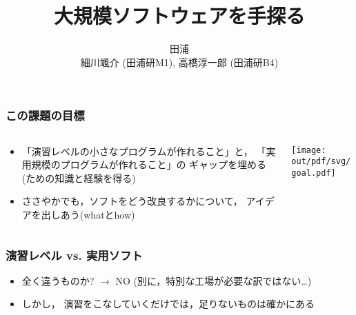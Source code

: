 \documentclass[12pt,dvipdfmx]{beamer}
\title{大規模ソフトウェアを手探る}
\institute{}
\author{田浦 \\ 細川颯介 (田浦研M1), 高橋淳一郎 (田浦研B4) }
\date{}
\newcommand{\mura}[1]{{\color{purple}#1}}
\begin{document}
\maketitle

\iffalse
\begin{frame}
\frametitle{Contents}
\tableofcontents
\end{frame}
\fi

\begin{frame}
\frametitle{この課題の目標}
\begin{columns}
\begin{column}{0.4\textwidth}
  \begin{itemize}
  \item 「演習レベルの小さなプログラムが作れること」と，
    「実用規模のプログラムが作れること」の
    ギャップを埋める(ための知識と経験を得る)
  \item ささやかでも，ソフトをどう改良するかについて，
    アイデアを出しあう(whatとhow)
  \end{itemize}
\end{column}
\begin{column}{0.6\textwidth}
\begin{center}
\texttt{[image: out/pdf/svg/goal.pdf]}
\end{center}
\end{column}
\end{columns}
\end{frame}

\begin{frame}
\frametitle{演習レベル vs. 実用ソフト}
\begin{itemize}
\item 全く違うものか? $\rightarrow$ NO 
  (別に，特別な工場が必要な訳ではない\ldots)

\item しかし，
  \mura{演習をこなしていくだけでは，足りないものは確かにある}
\end{itemize}
\end{frame}
\end{document}
